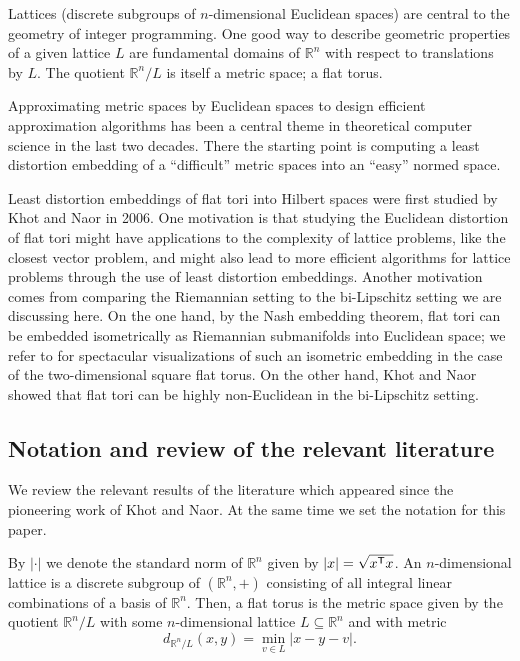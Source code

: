 \documentclass{amsart}
\newcommand{\R}{\mathbb{R}}
\begin{document}
Lattices (discrete subgroups of $n$-dimensional Euclidean spaces) are
central to the geometry of integer programming. One good way to
describe geometric properties of a given lattice $L$  are fundamental
domains of $\R^n$ with respect to translations by $L$. The quotient
$\R^n / L$ is itself a metric space; a flat torus.

Approximating metric spaces by Euclidean spaces to design efficient
approximation algorithms has been a central theme in theoretical
computer science in the last two decades. There the starting point is
computing a least distortion embedding of a ``difficult'' metric
spaces into an ``easy'' normed space.

Least distortion embeddings of flat tori into Hilbert spaces were
first studied by Khot and Naor \cite{Khot2006a} in 2006. One
motivation is that studying the Euclidean distortion of flat tori
might have applications to the complexity of lattice problems, like
the closest vector problem, and might also lead to more efficient
algorithms for lattice problems through the use of least distortion
embeddings. Another motivation comes from comparing the Riemannian
setting to the bi-Lipschitz setting we are discussing here.  On the
one hand, by the Nash embedding theorem, flat tori can be embedded
isometrically as Riemannian submanifolds into Euclidean space; we
refer to \cite{Borrelli2012a} for spectacular visualizations of such
an isometric embedding in the case of the two-dimensional square flat
torus. On the other hand, Khot and Naor showed that flat tori can be
highly non-Euclidean in the bi-Lipschitz setting.

%

\subsection{Notation and review of the relevant literature}

We review the relevant results of the literature which appeared since
the pioneering work of Khot and Naor. At the same time we set the
notation for this paper.

By $|\cdot|$ we denote the standard norm of $\R^n$
given by $|x| = \sqrt{x^{\sf T} x}$. An $n$-dimensional lattice is a discrete subgroup of $(\R^n, +)$
consisting of all integral linear combinations of a basis of
$\R^n$. Then, a flat torus is the metric space given by the quotient $\R^n / L$ with
some $n$-dimensional lattice $L \subseteq \R^n$ and with metric
\[
  d_{\R^n / L}(x,y) = \min_{v \in L} |x - y - v|.
\]
\end{document}
